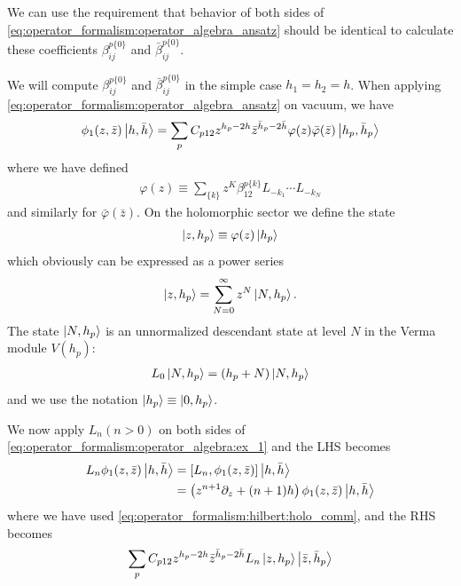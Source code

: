 \documentclass[10pt]{article}
\begin{document}
\begin{intu}
    We can use the requirement that behavior of both sides of \cref{eq:operator_formalism:operator_algebra_ansatz} should be identical to calculate these coefficients $\beta^{p\{0\}}_{ij}$ and $\bar{\beta}^{p\{0\}}_{ij}$.
\end{intu}
\begin{example}
    We will compute $\beta^{p\{0\}}_{ij}$ and $\bar{\beta}^{p\{0\}}_{ij}$ in the simple case $h_1=h_2=h$.
    When applying \cref{eq:operator_formalism:operator_algebra_ansatz} on vacuum, we have 
    \begin{align}\label{eq:operator_formalism:operator_algebra:ex_1}
        \phi_1(z,\bar{z})\ket{h,\bar{h}}=\sum_p C_{p12}z^{h_p-2h}\bar{z}^{\bar{h}_p-2\bar{h}}\varphi(z)\bar{\varphi}(\bar{z})\ket{h_p,\bar{h}_p}
    \end{align}
    where we have defined 
    \begin{align}
        \varphi(z)\equiv\sum_{\{k\}}z^K \beta_{12}^{p\{k\}}L_{-k_1}\cdots L_{-k_N}
    \end{align}
    and similarly for $\bar{\varphi}(\bar{z})$.
    On the holomorphic sector we define the state 
    \begin{align}
        \ket{z,h_p}\equiv\varphi(z)\ket{h_p}
    \end{align}
    which obviously can be expressed as a power series 
    \begin{align}
        \ket{z,h_p}=\sum_{N=0}^\infty z^N\ket{N,h_p}.
    \end{align} 
    The state $\ket{N,h_p}$ is an unnormalized descendant state at level $N$ in the Verma module $V(h_p)$:
    \begin{align}
        L_0\ket{N,h_p}=(h_p+N)\ket{N,h_p}
    \end{align}
    and we use the notation $\ket{h_p}\equiv\ket{0,h_p}$.

    We now apply $L_n (n>0)$ on both sides of \cref{eq:operator_formalism:operator_algebra:ex_1} and the LHS becomes 
    \begin{align}
        L_n\phi_1(z,\bar{z})\ket{h,\bar{h}}&=\comm{L_n}{\phi_1(z,\bar{z})}\ket{h,\bar{h}}\notag\\
                                           &=\left(z^{n+1}\partial_z+(n+1)h\right)\phi_1(z,\bar{z})\ket{h,\bar{h}}
    \end{align}
    where we have used \cref{eq:operator_formalism:hilbert:holo_comm}, and the RHS becomes 
    \begin{align}
        \sum_p C_{p12}z^{h_p-2h}\bar{z}^{\bar{h}_p-2\bar{h}}L_n\ket{z,h_p}\ket{\bar{z},\bar{h}_p}
    \end{align}
\end{example}
\end{document}
